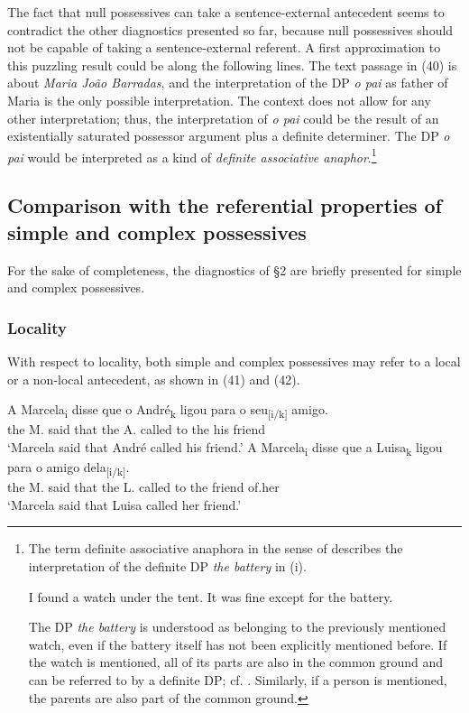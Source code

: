 \documentclass[output=paper]{langsci/langscibook}
\begin{document}
The fact that null possessives can take a sentence-external antecedent seems to contradict the other diagnostics presented so far, because null possessives should not be capable of taking a sentence-external referent. A first approximation to this puzzling result could be along the following lines. The text passage in (40) is about \textit{Maria João Barradas}, and the interpretation of the DP \textit{o pai} as father of Maria is the only possible interpretation. The context does not allow for any other interpretation; thus, the interpretation of \textit{o pai} could be the result of an existentially saturated possessor argument plus a definite determiner. The DP \textit{o pai} would be interpreted as a kind of \textit{definite associative anaphor}.\footnote{The term definite associative anaphora in the sense of \citet{Hawkins1978} describes the interpretation of the definite DP \textit{the battery} in (i).

\ea  I found a watch under the tent. It was fine except for the battery.
\z

The DP \textit{the battery} is understood as belonging to the previously mentioned watch, even if the battery itself has not been explicitly mentioned before. If the watch is mentioned, all of its parts are also in the common ground and can be referred to by a definite DP; cf. \citet{Heim1991}. Similarly, if a person is mentioned, the parents are also part of the common ground.}\textsuperscript{} 

\subsection{Comparison with the referential properties of simple and complex possessives}%

For the sake of completeness, the diagnostics of §2 are briefly presented for simple and complex possessives.

\subsubsection{Locality}%

With respect to locality, both simple and complex possessives may refer to a local or a non-local antecedent, as shown in (41) and (42).

\ea%
    \label{ex:wein:41}
    \ea
    \gll A Marcela\textsubscript{i} disse que o André\textsubscript{k} ligou para o seu\textsubscript{[i/k]} amigo.\\
         the M. said that the A. called to the his friend\\
    \glt ‘Marcela said that André called his friend.’
    \ex  
    \gll A Marcela\textsubscript{i} disse que a Luisa\textsubscript{k} ligou para o amigo dela\textsubscript{[i/k]}.\\
         the M. said that the L. called to the friend of.her\\
    \glt ‘Marcela said that Luisa called her friend.’
    \z
\z
\end{document}
